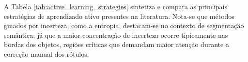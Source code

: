 A Tabela \ref{tab:active_learning_strategies} sintetiza e compara as principais estratégias de aprendizado ativo presentes na literatura. Nota-se que métodos guiados por incerteza, como a entropia, destacam-se no contexto de segmentação semântica, já que a maior concentração de incerteza ocorre tipicamente nas bordas dos objetos, regiões críticas que demandam maior atenção durante a correção manual dos rótulos.




